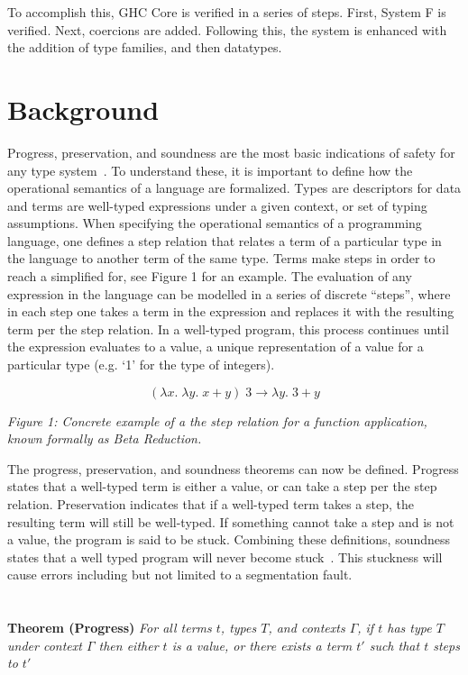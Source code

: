 \documentclass{sig-alternate}
\begin{document}
To accomplish this, GHC Core is verified in a series of steps. First, System F is verified. Next, coercions are added. Following this, the system is enhanced with the addition of type families, and then datatypes.

\section{Background}
\label{sec:background}
Progress, preservation, and soundness are the most basic indications of safety for any type system~\cite{Pierce:TAPL}. To understand these, it is important to define how the operational semantics of a language are formalized. Types are descriptors for data and terms are well-typed expressions under a given context, or set of typing assumptions. When specifying the operational semantics of a programming language, one defines a step relation that relates a term of a particular type in the language to another term of the same type. Terms make steps in order to reach a simplified for, see Figure 1 for an example. The evaluation of any expression in the language can be modelled in a series of discrete ``steps'', where in each step one takes a term in the expression and replaces it with the resulting term per the step relation. In a well-typed program, this process continues until the expression evaluates to a value, a unique representation of a value for a particular type (e.g. `1' for the type of integers).

$$(\lambda x .\; \lambda y .\;x+y)\; 3 \rightarrow \lambda y.\;3+y$$
\begin{center}
\it Figure 1: Concrete example of a the step relation for a function application, known formally as Beta Reduction.
\end{center}

The progress, preservation, and soundness theorems can now be defined. Progress states that a well-typed term is either a value, or can take a step per the step relation. Preservation indicates that if a well-typed term takes a step, the resulting term will still be well-typed. If something cannot take a step and is not a value, the program is said to be stuck. Combining these definitions, soundness states that a well typed program will never become stuck~\cite{Pierce:TAPL}. This stuckness will cause errors including but not limited to a segmentation fault. \\\\\\
\noindent\textbf{Theorem (Progress)} \textit{For all terms $t$, types $T$, and contexts $\Gamma$, if $t$ has type $T$ under context $\Gamma$ then either $t$ is a value, or there exists a term $t'$ such that $t$ steps to $t'$} \\
\end{document}

